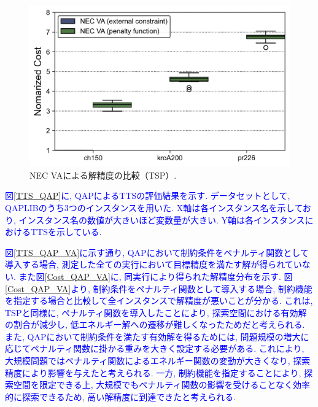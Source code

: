 \documentclass[submit,techrep,noauthor]{ipsj}
\begin{document}
\begin{figure}[th]
\centering
\includegraphics[bb=0 0 700 230, width=15cm]{Cost_TSP_VA.png}
\caption{NEC VAによる解精度の比較（TSP）.}
\label{Cost_TSP_VA}
\end{figure}

\textcolor{blue}{図\ref{TTS_QAP}に, QAPによるTTSの評価結果を示す. データセットとして, QAPLIB\cite{qaplib}のうち3つのインスタンスを用いた. X軸は各インスタンス名を示しており, インスタンス名の数値が大きいほど変数量が大きい. Y軸は各インスタンスにおけるTTSを示している. }

\textcolor{blue}{図\ref{TTS_QAP_VA}に示す通り, QAPにおいて制約条件をペナルティ関数として導入する場合, 測定した全ての実行において目標精度を満たす解が得られていない. また図\ref{Cost_QAP_VA}に, 同実行により得られた解精度分布を示す. 図\ref{Cost_QAP_VA}より, 制約条件をペナルティ関数として導入する場合, 制約機能を指定する場合と比較して全インスタンスで解精度が悪いことが分かる. これは, TSPと同様に, ペナルティ関数を導入したことにより, 探索空間における有効解の割合が減少し, 低エネルギー解への遷移が難しくなったためだと考えられる. 
また, QAPにおいて制約条件を満たす有効解を得るためには, 問題規模の増大に応じてペナルティ関数に掛かる重みを大きく設定する必要がある\cite{qaplib}. これにより, 大規模問題ではペナルティ関数によるエネルギー関数の変動が大きくなり, 探索精度により影響を与えたと考えられる. 一方, 制約機能を指定することにより, 探索空間を限定できる上, 大規模でもペナルティ関数の影響を受けることなく効率的に探索できるため, 高い解精度に到達できたと考えられる. }

\end{document}
